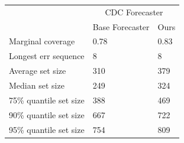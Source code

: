 \begin{tabular}{lll}
\toprule
& \multicolumn{2}{c}{CDC Forecaster} \\
& Base Forecaster & Ours \\
\midrule
Marginal coverage & 0.78 & 0.83 \\
Longest err sequence & 8 & 8 \\
Average set size & 310 & 379 \\
Median set size & 249 & 324 \\
75\% quantile set size & 388 & 469 \\
90\% quantile set size & 667 & 722 \\
95\% quantile set size & 754 & 809 \\
\bottomrule
\end{tabular}
